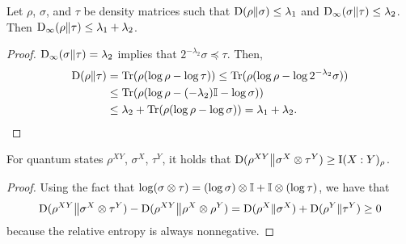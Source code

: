 %

\begin{proposition}
\label{prop:relative_min_entropy_chain_rule2}
Let $\rho$, $\sigma$, and $\tau$ be density matrices such that $\mathrm{D}(\rho \| \sigma) \leq \lambda_1$ and $\mathrm{D}_\infty(\sigma \| \tau) \leq \lambda_2$. Then $\mathrm{D}_\infty(\rho \| \tau) \leq \lambda_1 + \lambda_2$.
\end{proposition}
\begin{proof}
	$\mathrm{D}_\infty(\sigma \| \tau) = \lambda_2$ implies that $2^{-\lambda_2} \sigma \preceq \tau$. Then,
	\begin{align*}
		\mathrm{D}(\rho \| \tau) &= \mbox{\rm Tr}(\rho (\log \rho - \log \tau)) \leq \mbox{\rm Tr}(\rho(\log \rho - \log 2^{-\lambda_2} \sigma)) \\
		&\leq \mbox{\rm Tr}(\rho(\log \rho - (-\lambda_2)\mathbb{I} - \log \sigma)) \\
		&\leq \lambda_2 + \mbox{\rm Tr}(\rho (\log \rho - \log \sigma)) = \lambda_1 + \lambda_2.
	\end{align*}
\end{proof}


\begin{proposition}
\label{prop:divergence_gibbs_inequality}
	For quantum states $\rho^{XY}$, $\sigma^X$, $\tau^Y$, it holds that $\mathrm{D}(\rho^{XY} \big \| \sigma^X \otimes \tau^Y) \geq \mathrm{I}(X : Y)_\rho$.
\end{proposition}
\begin{proof}
	Using the fact that $\log (\sigma \otimes \tau) = (\log \sigma)\otimes \mathbb{I} + \mathbb{I} \otimes (\log \tau)$, we have that
	\[
	\mathrm{D}(\rho^{XY} \big \| \sigma^X \otimes \tau^Y) - \mathrm{D}(\rho^{XY} \big \| \rho^X \otimes \rho^Y) = \mathrm{D}(\rho^X \| \sigma^X) + \mathrm{D}(\rho^Y \| \tau^Y) \geq 0
	\]
	because the relative entropy is always nonnegative.
\end{proof}

